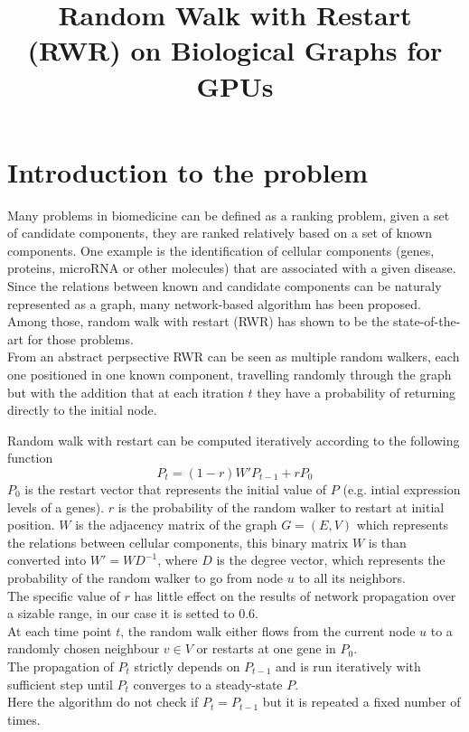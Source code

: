 \documentclass[a4paper]{article}
\title{Random Walk with Restart (RWR) on Biological Graphs for GPUs}
\begin{document}
\maketitle
\tableofcontents
\newpage

\section{Introduction to the problem}

Many problems in biomedicine can be defined as a ranking problem, given
a set of candidate components, they are ranked relatively based on a 
set of known components. One example is the identification of cellular components 
(genes, proteins, microRNA or other molecules) that are associated with a given disease.
Since the relations between known and candidate components can be naturaly represented as 
a graph, many network-based algorithm has been proposed. Among those, random walk
with restart (RWR) has shown to be the state-of-the-art for those problems.\\
From an abstract perpsective RWR can be seen as multiple random walkers, each one
positioned in one known component, travelling randomly through the graph but with
the addition that at each itration $t$ they have a probability of 
returning directly to the initial node.

Random walk with restart can be computed iteratively according to the 
following function
\begin{equation}
    P_{t} = (1-r)W'P_{t-1} + rP_0
\end{equation}
$P_0$ is the restart vector that represents the initial value of $P$ (e.g.
intial expression levels of a genes). $r$ is the
probability of the random walker to restart at initial position. $W$ is the
adjacency matrix of the graph $G=(E,V)$ which represents the relations between
cellular components, this binary matrix $W$ is than converted into $W'=WD^{-1}$,
where $D$ is the degree vector, which represents the probability of the 
random walker to go from node $u$ to all its neighbors.\\
The specific value of $r$ has little effect on the results of network
propagation over a sizable range, in our case it is setted to 0.6.\\
At each time point $t$, the random walk either flows from the current node $u$
to a randomly chosen neighbour $v \in V$ or restarts at one gene in $P_0$.\\
The propagation of $P_t$ strictly depends on $P_{t-1}$ and is run iteratively
with sufficient step until $P_{t}$ converges to a steady-state $P$.\\
Here the algorithm do not check if $P_{t} = P_{t-1}$ but it is repeated a fixed
number of times.
\end{document}
